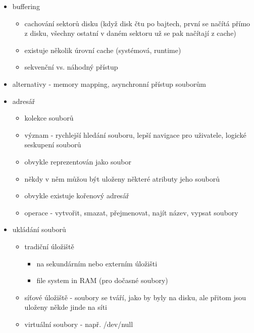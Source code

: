 \begin{itemize}
\begin{itemize}
\begin{itemize}
\begin{itemize}
\end{itemize}
\item některé části názvu souboru (počáteční tečka, přípona) mají speciální význam (ale přípona souboru nemusí souviset s reálným formátem souboru)
\item operace se soubory - vyčištění cache, změna atributů, vytvoření, smazání
\item file handle - číslo specifické pro proces, odkazuje na konkrétní soubor (stdin, stdout, stderr mají handles 0, 1, 2)
\end{itemize}
\item buffering
\begin{itemize}
\item cachování sektorů disku (když disk čtu po bajtech, první se načítá přímo z disku, všechny ostatní v daném sektoru už se pak načítají z cache)
\item existuje několik úrovní cache (systémová, runtime)
\item sekvenční vs. náhodný přístup
\end{itemize}
\item alternativy - memory mapping, asynchronní přístup souborům
\item adresář
\begin{itemize}
\item kolekce souborů
\item význam - rychlejší hledání souboru, lepší navigace pro uživatele, logické seskupení souborů
\item obvykle reprezentován jako soubor
\item někdy v něm můžou být uloženy některé atributy jeho souborů
\item obvykle existuje kořenový adresář
\item operace - vytvořit, smazat, přejmenovat, najít název, vypsat soubory
\end{itemize}
\item ukládání souborů
\begin{itemize}
\item tradiční úložiště
\begin{itemize}
\item na sekundárním nebo externím úložišti
\item file system in RAM (pro dočasné soubory)
\end{itemize}
\item síťové úložiště - soubory se tváří, jako by byly na disku, ale přitom jsou uloženy někde jinde na síti
\item virtuální soubory - např. /dev/null

\end{itemize}
\end{itemize}
\end{itemize}
